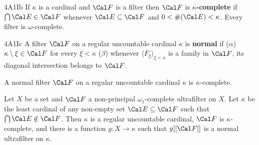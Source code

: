 \spheader 4A1Ib If $\kappa$ is a cardinal and $\Cal F$ is a filter
then $\Cal F$ is {\bf $\kappa$-complete} if $\bigcap\Cal E\in\Cal F$
whenever $\Cal E\subseteq\Cal F$ and $0<\#(\Cal E)<\kappa$.
Every filter is $\omega$-complete.

\spheader 4A1Ic A filter $\Cal F$ on a regular uncountable cardinal
$\kappa$ is {\bf normal} if ($\alpha$) $\kappa\setminus\xi\in\Cal F$ for
every $\xi<\kappa$ ($\beta$) whenever
$\langle F_{\xi}\rangle_{\xi<\kappa}$ is a family in $\Cal F$, its
diagonal intersection belongs to $\Cal F$.

 A normal filter $\Cal F$ on a regular uncountable
cardinal $\kappa$ is $\kappa$-complete.


 Let $X$ be a set and $\Cal F$ a non-principal
$\omega_1$-complete ultrafilter on $X$.   Let $\kappa$ be the least
cardinal of any non-empty set $\Cal E\subseteq\Cal F$ such that
$\bigcap\Cal E\notin\Cal F$.   Then $\kappa$ is a regular uncountable
cardinal, $\Cal F$ is $\kappa$-complete, and
there is a function $g:X\to\kappa$ such that $g[[\Cal F]]$ is a normal
ultrafilter on $\kappa$.

